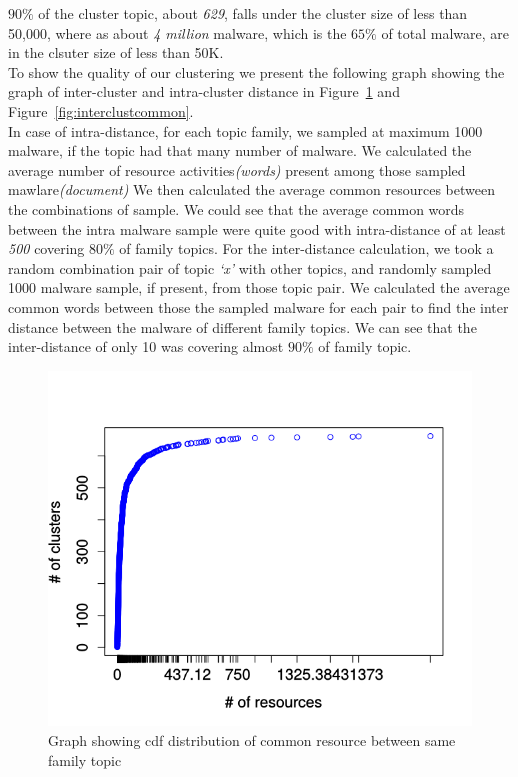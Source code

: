 $90\%$ of the cluster topic, about \emph{629}, falls under the cluster size of less than 50,000, where as about \emph{4 million} malware, which is the $65\%$ of total malware, are in the clsuter size of less than 50K.\\
To show the quality of our clustering we present the following graph showing the graph of inter-cluster and intra-cluster distance in Figure~\ref{fig:intraclustcommon} and Figure~\ref{fig:interclustcommon}.\\
In case of intra-distance, for each topic family, we sampled at maximum 1000 malware, if the topic had that many number of malware. We calculated the average number of resource activities\textit{(words)} present among those sampled mawlare\textit{(document)}
We then calculated the average common resources between the combinations of sample. We could see that the average common words between the intra malware sample were quite good with intra-distance of at least \emph{500} covering $80\%$ of family topics.
For the inter-distance calculation, we took a random combination pair of topic \emph{`x'} with other topics, and randomly sampled 1000 malware sample, if present, from those topic pair.
We calculated the average common words between those the sampled malware for each pair to find the inter distance between the malware of different family topics.
We can see that the inter-distance of only 10 was covering almost $90\%$ of family topic.
\begin{figure}[htbp]
\begin{center}
  \includegraphics[scale=0.7]{figures/intra_clustered_common.png}
\end{center}
\captionsetup{font=small}
\caption{ Graph showing cdf distribution of common resource between same family topic}
\label{fig:intraclustcommon}
\end{figure}
